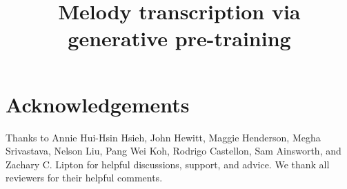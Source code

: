 \documentclass{article}
\title{
Melody transcription via generative pre-training
}
\begin{document}
\maketitle

\begin{abstract}

\end{abstract}



















\section{Acknowledgements}

Thanks to 
Annie Hui-Hsin Hsieh, %
John Hewitt, %
Maggie Henderson, %
Megha Srivastava, %
Nelson Liu, %
Pang Wei Koh, %
Rodrigo Castellon, %
Sam Ainsworth, %
and
Zachary C. Lipton %
for helpful discussions, support, and advice. 
We thank all reviewers for their helpful comments.


\end{document}
